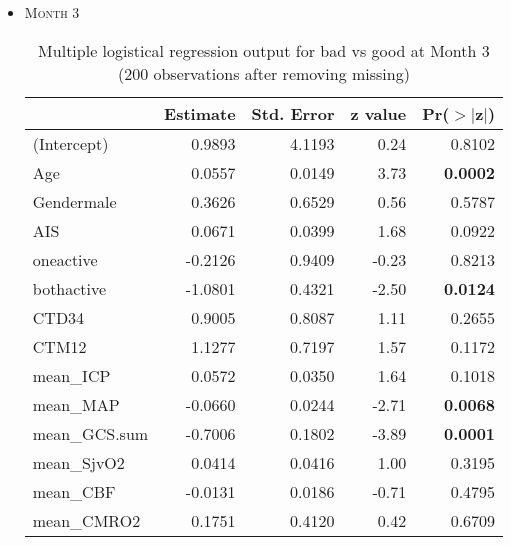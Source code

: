 \documentclass{article}
\begin{document}
\begin{itemize}
\item \textsc{Month 3}
\begin{table}[H]
\centering
\begin{tabular}{lrrrr}
  \hline
 & Estimate & Std. Error & z value & Pr($>$$|$z$|$) \\ 
  \hline
(Intercept) & 0.9893 & 4.1193 & 0.24 & 0.8102 \\ 
  Age & 0.0557 & 0.0149 & 3.73 & {\bf 0.0002} \\ 
  Gendermale & 0.3626 & 0.6529 & 0.56 & 0.5787 \\ 
  AIS & 0.0671 & 0.0399 & 1.68 & 0.0922 \\ 
  oneactive & -0.2126 & 0.9409 & -0.23 & 0.8213 \\ 
  bothactive & -1.0801 & 0.4321 & -2.50 & {\bf 0.0124} \\ 
  CTD34 & 0.9005 & 0.8087 & 1.11 & 0.2655 \\ 
  CTM12 & 1.1277 & 0.7197 & 1.57 & 0.1172 \\ 
  mean\_ICP & 0.0572 & 0.0350 & 1.64 & 0.1018 \\ 
  mean\_MAP & -0.0660 & 0.0244 & -2.71 & {\bf 0.0068} \\ 
  mean\_GCS.sum & -0.7006 & 0.1802 & -3.89 & {\bf 0.0001} \\ 
  mean\_SjvO2 & 0.0414 & 0.0416 & 1.00 & 0.3195 \\ 
  mean\_CBF & -0.0131 & 0.0186 & -0.71 & 0.4795 \\ 
  mean\_CMRO2 & 0.1751 & 0.4120 & 0.42 & 0.6709 \\ 
   \hline
\end{tabular}
\caption{Multiple logistical regression output for bad vs good at Month 3 (200 observations after removing missing)}
\end{table}


\end{itemize}
\end{document}
